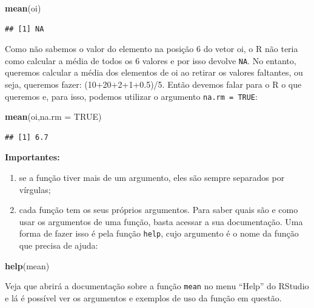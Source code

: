 \documentclass[
]{book}
\newenvironment{Shaded}{\begin{snugshade}}{\end{snugshade}}
\newcommand{\DataTypeTok}[1]{\textcolor[rgb]{0.13,0.29,0.53}{#1}}
\newcommand{\KeywordTok}[1]{\textcolor[rgb]{0.13,0.29,0.53}{\textbf{#1}}}
\newcommand{\NormalTok}[1]{#1}
\newcommand{\OtherTok}[1]{\textcolor[rgb]{0.56,0.35,0.01}{#1}}
\begin{document}
\begin{Shaded}
\begin{Highlighting}[]
\KeywordTok{mean}\NormalTok{(oi)}
\end{Highlighting}
\end{Shaded}

\begin{verbatim}
## [1] NA
\end{verbatim}

Como não sabemos o valor do elemento na posição 6 do vetor oi, o R não teria como calcular a média de todos os 6 valores e por isso devolve \texttt{NA}. No entanto, queremos calcular a média dos elementos de oi ao retirar os valores faltantes, ou seja, queremos fazer: (10+20+2+1+0.5)/5.
Então devemos falar para o R o que queremos e, para isso, podemos utilizar o argumento \texttt{na.rm\ =\ TRUE}:

\begin{Shaded}
\begin{Highlighting}[]
\KeywordTok{mean}\NormalTok{(oi,}\DataTypeTok{na.rm =} \OtherTok{TRUE}\NormalTok{)}
\end{Highlighting}
\end{Shaded}

\begin{verbatim}
## [1] 6.7
\end{verbatim}

\textbf{Importantes:}

\begin{enumerate}
\def\labelenumi{\arabic{enumi})}
\item
  se a função tiver mais de um argumento, eles são sempre separados por vírgulas;
\item
  cada função tem os seus próprios argumentos. Para saber quais são e como usar os argumentos de uma função, basta acessar a sua documentação. Uma forma de fazer isso é pela função \texttt{help}, cujo argumento é o nome da função que precisa de ajuda:
\end{enumerate}

\begin{Shaded}
\begin{Highlighting}[]
\KeywordTok{help}\NormalTok{(mean)}
\end{Highlighting}
\end{Shaded}

Veja que abrirá a documentação sobre a função \texttt{mean} no menu ``Help'' do RStudio e lá é possível ver os argumentos e exemplos de uso da função em questão.
\end{document}
